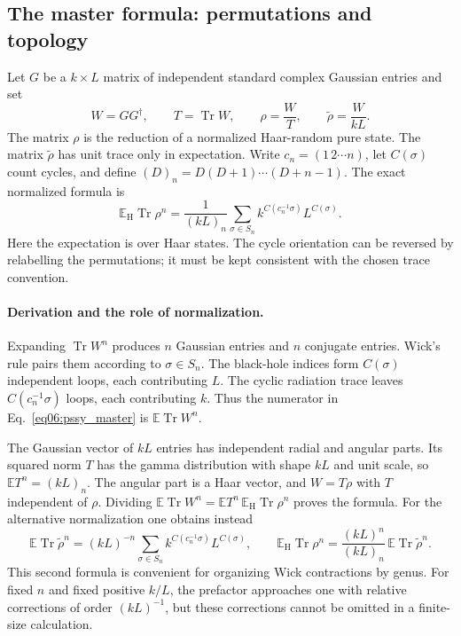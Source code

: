 \documentclass[11pt,letterpaper]{article}
\theoremstyle{plain}
\theoremstyle{definition}
\theoremstyle{remark}
\begin{document}
\subsection{The master formula: permutations and topology}
\label{subsec06:master_formula}

Let $G$ be a $k\times L$ matrix of independent standard complex Gaussian
entries and set
\begin{equation}
 W=GG^\dagger,\qquad T=\operatorname{Tr}W,\qquad
 \rho=\frac WT,\qquad \widetilde\rho=\frac W{kL}.
 \label{eq06:normalizations}
\end{equation}
The matrix $\rho$ is the reduction of a normalized Haar-random pure state.
The matrix $\widetilde\rho$ has unit trace only in expectation.  Write
$c_n=(1\,2\cdots n)$, let $C(\sigma)$ count cycles, and define
$(D)_n=D(D+1)\cdots(D+n-1)$.  The exact normalized formula is
\begin{equation}
 \boxed{\quad
 \mathbb E_{\mathrm H}\operatorname{Tr}\rho^n
 =\frac{1}{(kL)_n}\sum_{\sigma\in S_n}
 k^{C(c_n^{-1}\sigma)}L^{C(\sigma)}.\quad}
 \label{eq06:pssy_master}
\end{equation}
Here the expectation is over Haar states.  The cycle orientation can be
reversed by relabelling the permutations; it must be kept consistent with the
chosen trace convention.

\paragraph{Derivation and the role of normalization.}
Expanding $\operatorname{Tr}W^n$ produces $n$ Gaussian entries and $n$
conjugate entries.  Wick's rule pairs them according to $\sigma\in S_n$.
The black-hole indices form $C(\sigma)$ independent loops, each contributing
$L$.  The cyclic radiation trace leaves $C(c_n^{-1}\sigma)$ loops, each
contributing $k$.  Thus the numerator in Eq.~\eqref{eq06:pssy_master} is
$\mathbb E\operatorname{Tr}W^n$.

The Gaussian vector of $kL$ entries has independent radial and angular parts.
Its squared norm $T$ has the gamma distribution with shape $kL$ and unit scale,
so $\mathbb E T^n=(kL)_n$.  The angular part is a Haar vector, and
$W=T\rho$ with $T$ independent of $\rho$.  Dividing
$\mathbb E\operatorname{Tr}W^n=\mathbb E T^n\,
\mathbb E_{\mathrm H}\operatorname{Tr}\rho^n$ proves the formula.
For the alternative normalization one obtains instead
\begin{equation}
 \mathbb E\operatorname{Tr}\widetilde\rho^n
 =(kL)^{-n}\sum_{\sigma\in S_n}
 k^{C(c_n^{-1}\sigma)}L^{C(\sigma)},\qquad
 \mathbb E_{\mathrm H}\operatorname{Tr}\rho^n
 =\frac{(kL)^n}{(kL)_n}\,
 \mathbb E\operatorname{Tr}\widetilde\rho^n.
 \label{eq06:mean_normalized_master}
\end{equation}
This second formula is convenient for organizing Wick contractions by genus.
For fixed $n$ and fixed positive $k/L$, the prefactor approaches one with
relative corrections of order $(kL)^{-1}$, but these corrections cannot be
omitted in a finite-size calculation.
\end{document}
